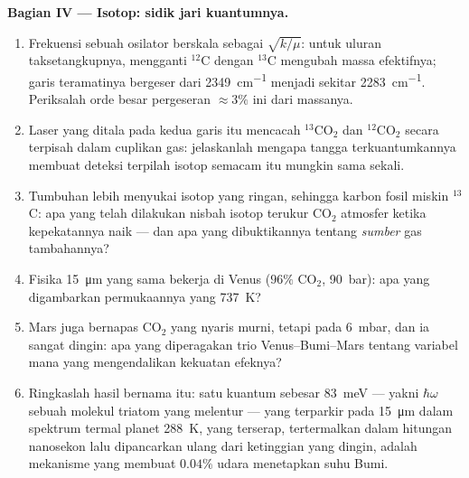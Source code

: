 \begin{problem}
\medskip\noindent\textbf{Bagian IV --- Isotop: sidik jari
kuantumnya.}
\begin{enumerate}[resume]
  \item Frekuensi sebuah osilator berskala sebagai $\sqrt{k/\mu}$: untuk
        uluran taksetangkupnya, mengganti $^{12}$C dengan $^{13}$C
        mengubah massa efektifnya; garis teramatinya bergeser dari
        \qty{2349}{cm^{-1}} menjadi sekitar \qty{2283}{cm^{-1}}.
        Periksalah orde besar pergeseran $\approx 3\%$ ini dari massanya.
  \item Laser yang ditala pada kedua garis itu mencacah $^{13}$CO$_2$
        dan $^{12}$CO$_2$ secara terpisah dalam cuplikan gas:
        jelaskanlah mengapa tangga terkuantumkannya membuat deteksi
        terpilah isotop semacam itu mungkin sama sekali.
  \item Tumbuhan lebih menyukai isotop yang ringan, sehingga karbon
        fosil miskin $^{13}$C: apa yang telah dilakukan nisbah isotop
        terukur CO$_2$ atmosfer ketika kepekatannya naik --- dan apa
        yang dibuktikannya tentang \emph{sumber} gas tambahannya?
  \item Fisika \qty{15}{\micro m} yang sama bekerja di Venus
        ($96\%$ CO$_2$, \qty{90}{bar}): apa yang digambarkan
        permukaannya yang \qty{737}{K}?
  \item Mars juga bernapas CO$_2$ yang nyaris murni, tetapi pada
        \qty{6}{mbar}, dan ia sangat dingin: apa yang diperagakan trio
        Venus--Bumi--Mars tentang variabel mana yang mengendalikan
        kekuatan efeknya?
  \item Ringkaslah hasil bernama itu: satu kuantum sebesar \qty{83}{meV}
        --- yakni $\hbar\omega$ sebuah molekul triatom yang melentur ---
        yang terparkir pada \qty{15}{\micro m} dalam spektrum termal
        planet \qty{288}{K}, yang terserap, tertermalkan dalam hitungan
        nanosekon lalu dipancarkan ulang dari ketinggian yang dingin,
        adalah mekanisme yang membuat $0.04\%$ udara menetapkan suhu
        Bumi.
\end{enumerate}
\end{problem}
